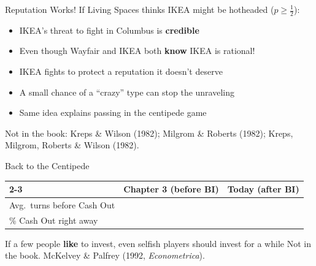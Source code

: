 \begin{frame}{Reputation Works!}
If Living Spaces thinks IKEA might be hotheaded ($p\ge\tfrac12$):
\begin{itemize}
    \item IKEA's threat to fight in Columbus is \textbf{credible}
    \item Even though Wayfair and IKEA both \textbf{know} IKEA is rational!
    \item IKEA fights to protect a reputation it doesn't deserve
\end{itemize}
\bsk
{}
\begin{itemize}
    \item<2-> A small chance of a ``crazy'' type can stop the unraveling
    \item<2-> Same idea explains passing in the centipede game
\end{itemize}
\bsk
{}
\vfill
{\footnotesize Not in the book: Kreps \& Wilson (1982); Milgrom \& Roberts (1982); Kreps, Milgrom, Roberts \& Wilson (1982).}
\vspace{-0.2in}
\end{frame}

\begin{frame}{Back to the Centipede}
\vspace{0.3in}
\centering
\renewcommand{\arraystretch}{2}
\begin{tabular}{l|c|c|}
\cline{2-3}
 & Chapter 3 (before BI) & Today (after BI) \\
\hline
\multicolumn{1}{|l|}{Avg.\ turns before Cash Out} & \hspace{1in} & \hspace{1in} \\
\hline
\multicolumn{1}{|l|}{\% Cash Out right away} & & \\
\hline
\end{tabular}
\bsk
\raggedright
If a few people \textbf{like} to invest, even selfish players should invest for a while
\vfill
{\footnotesize Not in the book. McKelvey \& Palfrey (1992, \textit{Econometrica}).}
\vspace{-0.2in}
\end{frame}

